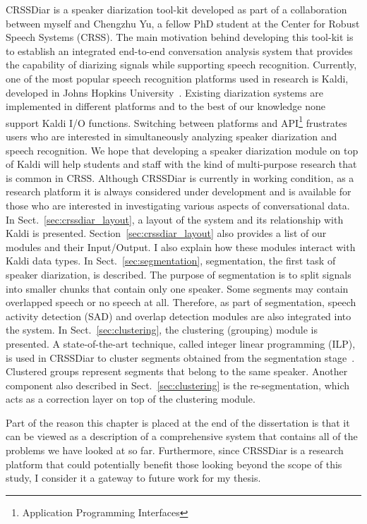 CRSSDiar is a speaker diarization tool-kit developed as part of a collaboration between myself and Chengzhu Yu, a fellow PhD student at the Center for Robust Speech Systems (CRSS). 
The main motivation behind developing this tool-kit is to establish an integrated end-to-end conversation analysis system that provides the capability of diarizing  signals while supporting speech recognition. 
Currently, one of the most popular speech recognition platforms used in research is Kaldi, developed in Johns Hopkins University~\cite{kaldi}. 
Existing diarization systems are implemented in different platforms and to the best of our knowledge none support Kaldi I/O functions. 
Switching between platforms and API\footnote{Application Programming Interfaces} frustrates users who are interested in simultaneously analyzing speaker diarization and speech recognition. 
We hope that developing a speaker diarization module on top of Kaldi will help students and staff with the kind of multi-purpose research that is common in CRSS. 
Although CRSSDiar is currently in working condition, as a research platform it is always considered under development and is available for those who are interested in investigating various aspects of conversational data. 
In Sect.~\ref{sec:crssdiar_layout}, a layout of the system and its relationship with Kaldi is presented. 
Section~\ref{sec:crssdiar_layout} also provides a list of our modules and their Input/Output. 
I also explain how these modules interact with Kaldi data types. 
In Sect.~\ref{sec:segmentation}, segmentation, the first task of speaker diarization, is described. 
The purpose of segmentation is to split signals into smaller chunks that contain only one speaker. 
Some segments may contain overlapped speech or no speech at all. 
Therefore, as part of segmentation, speech activity detection (SAD) and overlap detection modules are also integrated into the system. 
In Sect.~\ref{sec:clustering}, the clustering (grouping) module is presented. 
A state-of-the-art technique, called integer linear programming (ILP), is used in CRSSDiar to cluster segments obtained from the segmentation stage~\cite{bredin2013ILP}. 
Clustered groups represent segments that belong to the same speaker. Another component also described in Sect.~\ref{sec:clustering} is the re-segmentation, which acts as a correction layer on top of the clustering module. 

Part of the reason this chapter is placed at the end of the dissertation is that it can be viewed as a description of a comprehensive system that contains all of the problems we have looked at so far. 
Furthermore, since CRSSDiar is a research platform that could potentially benefit those looking beyond the scope of this study, I consider it a gateway to future work for my thesis. 



